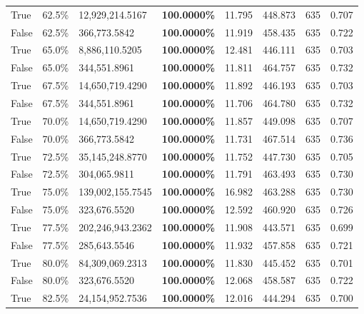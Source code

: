 \begin{table}[H]
\begin{tabular}{lllrllll}
\cline{1-8}
True & 62.5\% & 12,929,214.5167 & \bfseries \color{red} 100.0000\% & 11.795 & 448.873 & 635 & 0.707 \\
\cline{1-8}
False & 62.5\% & 366,773.5842 & \bfseries \color{red} 100.0000\% & 11.919 & 458.435 & 635 & 0.722 \\
\cline{1-8}
True & 65.0\% & 8,886,110.5205 & \bfseries \color{red} 100.0000\% & 12.481 & 446.111 & 635 & 0.703 \\
\cline{1-8}
False & 65.0\% & 344,551.8961 & \bfseries \color{red} 100.0000\% & 11.811 & 464.757 & 635 & 0.732 \\
\cline{1-8}
True & 67.5\% & 14,650,719.4290 & \bfseries \color{red} 100.0000\% & 11.892 & 446.193 & 635 & 0.703 \\
\cline{1-8}
False & 67.5\% & 344,551.8961 & \bfseries \color{red} 100.0000\% & 11.706 & 464.780 & 635 & 0.732 \\
\cline{1-8}
True & 70.0\% & 14,650,719.4290 & \bfseries \color{red} 100.0000\% & 11.857 & 449.098 & 635 & 0.707 \\
\cline{1-8}
False & 70.0\% & 366,773.5842 & \bfseries \color{red} 100.0000\% & 11.731 & 467.514 & 635 & 0.736 \\
\cline{1-8}
True & 72.5\% & 35,145,248.8770 & \bfseries \color{red} 100.0000\% & 11.752 & 447.730 & 635 & 0.705 \\
\cline{1-8}
False & 72.5\% & 304,065.9811 & \bfseries \color{red} 100.0000\% & 11.791 & 463.493 & 635 & 0.730 \\
\cline{1-8}
True & 75.0\% & 139,002,155.7545 & \bfseries \color{red} 100.0000\% & 16.982 & 463.288 & 635 & 0.730 \\
\cline{1-8}
False & 75.0\% & 323,676.5520 & \bfseries \color{red} 100.0000\% & 12.592 & 460.920 & 635 & 0.726 \\
\cline{1-8}
True & 77.5\% & 202,246,943.2362 & \bfseries \color{red} 100.0000\% & 11.908 & 443.571 & 635 & 0.699 \\
\cline{1-8}
False & 77.5\% & \color{red} 285,643.5546 & \bfseries \color{red} 100.0000\% & 11.932 & 457.858 & 635 & 0.721 \\
\cline{1-8}
True & 80.0\% & 84,309,069.2313 & \bfseries \color{red} 100.0000\% & 11.830 & 445.452 & 635 & 0.701 \\
\cline{1-8}
False & 80.0\% & 323,676.5520 & \bfseries \color{red} 100.0000\% & 12.068 & 458.587 & 635 & 0.722 \\
\cline{1-8}
True & 82.5\% & 24,154,952.7536 & \bfseries \color{red} 100.0000\% & 12.016 & 444.294 & 635 & 0.700 \\

\end{tabular}
\end{table}
